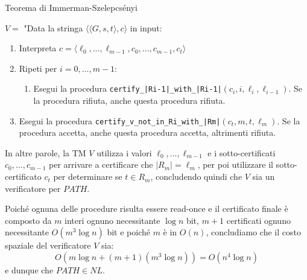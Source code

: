 \begin{Thm}{Teorema di Immerman-Szelepcsényi}{}
\begin{demonstration}
$V =$ "Data la stringa $\langle \langle G, s, t\rangle, c\rangle$ in input:
\begin{enumerate}
    \item Interpreta $c = \langle \ell_0,...,\ell_{m-1}, c_0,...,c_{m-1}, c_t\rangle$
    \item Ripeti per $i = 0, . . . , m-1$:
    \begin{enumerate}
        \item Esegui la procedura \texttt{certify\_|Ri-1|\_with\_|Ri-1|}$(c_i, i, \ell_i, \ell_{i-1})$. Se la procedura rifiuta, anche questa procedura rifiuta.
    \end{enumerate}
    \item Esegui la procedura \texttt{certify\_v\_not\_in\_Ri\_with\_|Rm|}$(c_t, m, t, \ell_m)$. Se la procedura accetta, anche questa procedura accetta, altrimenti rifiuta.
\end{enumerate}
In altre parole, la TM $V$ utilizza i valori $\ell_0,...,\ell_{m-1}$ e i sotto-certificati $c_0,...,c_{m-1}$ per arrivare a certificare che $|R_m| = \ell_m$, per poi utilizzare il sotto-certificato $c_t$ per determinare se $t\in R_m$, concludendo quindi che $V$ sia un verificatore per $PATH$.

Poiché ognuna delle procedure risulta essere read-once e il certificato finale è composto da $m$ interi ognuno necessitante $\log n$ bit, $m + 1$ certificati ognuno necessitante $O(m^3\log n)$ bit e poiché $m$ è in $O(n)$, concludiamo che il costo spaziale del verificatore $V$ sia:
\begin{equation*}
    O(m\log n+(m + 1)(m^3\log n)) = O(n^4\log n)
\end{equation*}
e dunque che $PATH\in NL$.
\end{demonstration}
\end{Thm}